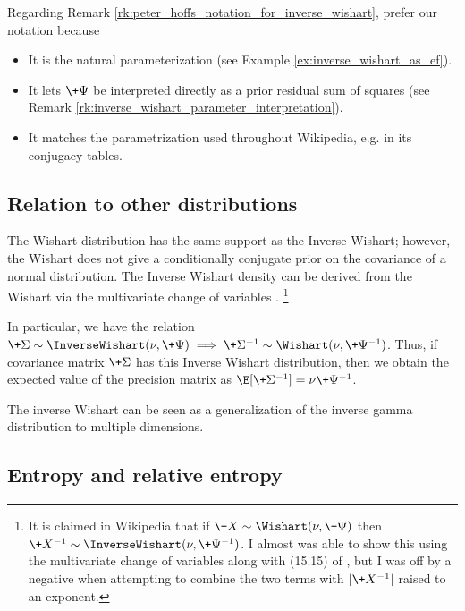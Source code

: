 \documentclass{article} %
\begin{document}
\begin{remark}{}
Regarding Remark \ref{rk:peter_hoffs_notation_for_inverse_wishart},  prefer our notation because 
\begin{itemize}
\item It is the natural parameterization (see Example \ref{ex:inverse_wishart_as_ef}).
\item It lets $\+\Psi$ be interpreted directly as a prior residual sum of squares (see Remark \ref{rk:inverse_wishart_parameter_interpretation}). 
\item It matches the parametrization used throughout Wikipedia,  e.g. in its conjugacy tables.
\end{itemize}
 
\end{remark}



\subsection{Relation to other distributions}
The Wishart distribution has the same support as the Inverse Wishart;  however,  the Wishart does not give a conditionally conjugate prior on the covariance of a normal distribution.    The Inverse Wishart density can be derived from the Wishart via the multivariate change of variables  \cite{wolpert2011change}. \footnote{It is claimed in Wikipedia that if $\+X \sim \Wishart(\nu,  \+\Psi)$  then $\+X^{-1} \sim \InverseWishart(\nu,  \+\Psi^{-1})$.   I almost was able to show this using the multivariate change of variables  \cite{wolpert2011change} along with (15.15) of \cite{dwyer1967some},  but I  was off by a negative when attempting to combine the two terms with $|\+X^{-1}|$ raised to an exponent.}

In particular,  we have the relation $\+\Sigma \sim \InverseWishart(\nu, \+\Psi) \implies \+\Sigma^{-1} \sim \Wishart(\nu,  \+\Psi^{-1})$.    Thus,  if covariance matrix $\+\Sigma$ has this Inverse Wishart distribution,  then we obtain the expected value of the precision matrix as $\E[\+\Sigma^{-1}] = \nu \+\Psi^{-1}$.

The inverse Wishart can be seen as a generalization of the inverse gamma distribution to multiple dimensions.


\subsection{Entropy and relative entropy}
\end{document}
